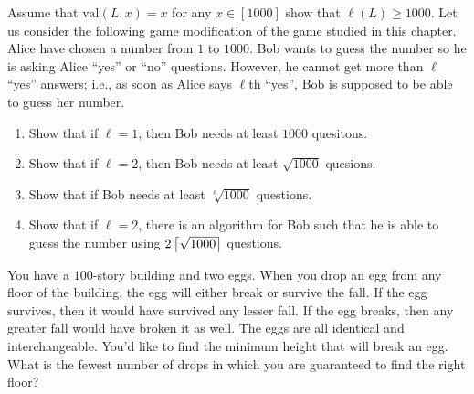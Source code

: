 \begin{chapterendexercises}
    Assume that $\mathrm{val}(L, x) = x$ for any $x \in [1000]$ show that 
    $\ell(L) \ge 1000$.
  \exercise
    Let us consider the following game modification of the game studied in this
    chapter. Alice have chosen a number from $1$ to $1000$. Bob wants to
    guess the number so he is asking Alice ``yes'' or ``no'' questions.
    However, he cannot get more than $\ell$ ``yes'' answers; i.e., as soon as Alice
    says $\ell$th ``yes'', Bob is supposed to be able to guess her number.
    \begin{enumerate} 
      \item Show that if $\ell = 1$, then Bob needs at least $1000$ quesitons.
      \item Show that if $\ell = 2$, then Bob needs at least $\sqrt{1000}$
        quesions.
      \item Show that if Bob needs at least $\sqrt[\ell]{1000}$ questions.
      \item Show that if $\ell = 2$, there is an algorithm for Bob such that he
        is able to guess the number using $2\left\lceil {\sqrt{1000}} \right\rceil$ questions.
    \end{enumerate}
  \exercise You have a $100$-story building and two eggs. When you drop an egg
    from any floor of the building, the egg will either break or survive the
    fall. If the egg survives, then it would have survived any lesser fall. If
    the egg breaks, then any greater fall would have broken it as well. The eggs
    are all identical and interchangeable. You’d like to find the minimum height
    that will break an egg. What is the fewest number of drops in which you are
    guaranteed to find the right floor?
\end{chapterendexercises}
